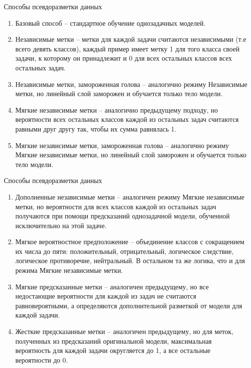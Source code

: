 \begin{frame}{Способы псевдоразметки данных}
    \begin{enumerate}
\item Базовый способ -- стандартное обучение однозадачных моделей.
\item Независимые метки -- метки для каждой задачи считаются независимыми (т.е всего девять классов), каждый пример имеет метку 1 для того класса своей задачи, к которому он принадлежит и 0 для всех остальных классов всех остальных задач. 
\item Независимые метки, замороженная голова -- аналогично режиму Независимые метки, но линейный слой заморожен и обучается только тело модели.
\item Мягкие независимые метки -- аналогично предыдущему подходу, но вероятности всех остальных классов каждой из остальных задач считаются равными друг другу так, чтобы их сумма равнялась 1. 
\item Мягкие независимые метки, замороженная голова -- аналогично режиму Мягкие независимые метки, но линейный слой заморожен и обучается только тело модели.
    \end{enumerate}
\end{frame}


\begin{frame}{Способы псевдоразметки данных}
    \begin{enumerate}
\item Дополненные независимые метки -- аналогичен режиму Мягкие независимые метки, но вероятности для всех классов каждой из остальных задач получаются при помощи предсказаний однозадачной модели, обученной исключительно на этой задаче.
\item Мягкое вероятностное предположение -- объединение классов с сокращением их числа до пяти: положительный, отрицательный, логическое следствие, логическое противоречие, нейтральный. В остальном та же логика, что и для режима Мягкие независимые метки.
\item Мягкие предсказанные метки -- аналогичен предыдущему, но все недостающие вероятности для каждой из задач не считаются равновероятными, а определяются дополнительной разметкой от модели для каждой задачи. 
\item Жесткие предсказанные метки -- аналогичен предыдущему, но для меток, полученных из предсказаний оригинальной модели, максимальная вероятность для каждой задачи округляется до 1, а все остальные вероятности до 0.
    \end{enumerate}
\end{frame}

